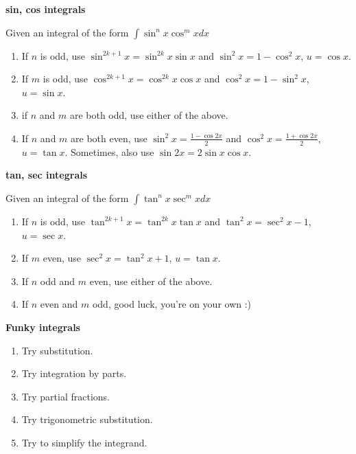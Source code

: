\documentclass[12pt]{article}
\begin{document}
\begin{mdframed}
  \textbf{sin, cos integrals}

  Given an integral of the form $\int \sin^n x \cos^m x dx$

  \begin{enumerate}
    \item If $n$ is odd, use $\sin^{2k+1} x = \sin^{2k} x \sin x$ and $\sin^2 x = 1 - \cos^2 x$, $u = \cos x$.
    \item If $m$ is odd, use $\cos^{2k+1} x = \cos^{2k} x \cos x$ and $\cos^2 x = 1 - \sin^2 x$,  $u = \sin x$.
    \item if $n$ and $m$ are both odd, use either of the above.
    \item If $n$ and $m$ are both even, use $\sin^2 x = \frac{1 - \cos 2x}{2}$ and $\cos^2 x = \frac{1 + \cos 2x}{2}$,  $u = \tan x$. Sometimes, also use $\sin 2x = 2 \sin x \cos x$.
  \end{enumerate}
\end{mdframed}

\begin{mdframed}
  \textbf{tan, sec integrals}

  Given an integral of the form $\int \tan^n x \sec^m x dx$

  \begin{enumerate}
    \item If $n$ is odd, use $\tan^{2k+1} x = \tan^{2k} x \tan x$ and $\tan^2 x = \sec^2 x - 1$, $u = \sec x$.
    \item If $m$ even, use $\sec^2 x = \tan^2 x + 1$, $u = \tan x$.
    \item If $n$ odd and $m$ even, use either of the above.
    \item If $n$ even and $m$ odd, good luck, you're on your own :)
  \end{enumerate}
\end{mdframed}


\begin{mdframed}
  \textbf{Funky integrals}

  \begin{enumerate}
    \item Try substitution.
    \item Try integration by parts.
    \item Try partial fractions.
    \item Try trigonometric substitution.
    \item Try to simplify the integrand.
  \end{enumerate}
\end{mdframed}
\end{document}
